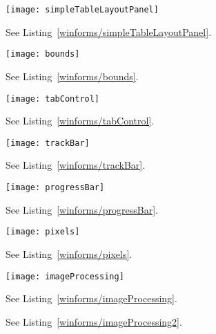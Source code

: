%
%
\begin{figure}
  \centering
  \texttt{[image: simpleTableLayoutPanel]}
  \caption{See Listing~\ref{winforms/simpleTableLayoutPanel}.}
  \label{fig: simpleTableLayoutPanel}
\end{figure}

%
%
\begin{figure}
  \centering
  \texttt{[image: bounds]}
  \caption{See Listing~\ref{winforms/bounds}.}
  \label{fig:bounds}
\end{figure}

%
%
\begin{figure}
  \centering
  \texttt{[image: tabControl]}
  \caption{See Listing~\ref{winforms/tabControl}.}
  \label{fig: tabControl}
\end{figure}

%
%
\begin{figure}
  \centering
  \texttt{[image: trackBar]}
  \caption{See Listing~\ref{winforms/trackBar}.}
  \label{fig: trackBar}
\end{figure}

%
%
\begin{figure}
  \centering
  \texttt{[image: progressBar]}
  \caption{See Listing~\ref{winforms/progressBar}.}
  \label{fig:progressBar}
\end{figure}

%
%
\begin{figure}
  \centering
  \texttt{[image: pixels]}
  \caption{See Listing~\ref{winforms/pixels}.}
  \label{fig:pixels}
\end{figure}

%
%
\begin{figure}
  \centering
  \texttt{[image: imageProcessing]}
  \caption{See Listing~\ref{winforms/imageProcessing}.}
  \label{fig:imageProcessing}
\end{figure}
%
%
\begin{figure}
  \centering
  \caption{See Listing~\ref{winforms/imageProcessing2}.}
  \label{fig:imageProcessing2}
\end{figure}


